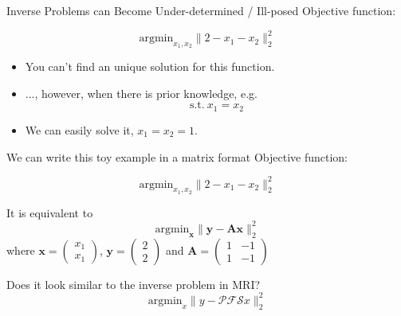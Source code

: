 \begin{frame}{Inverse Problems can Become Under-determined / Ill-posed}
	Objective function:
	
	\begin{equation}
		\mathrm{argmin}_{x_1, x_2} \lVert 2 - x_1 - x_2 \rVert_2^2
	\end{equation}

	\vfill
	
	\begin{itemize}
		\item <1-> You can't find an unique solution for this function.
		\vspace{1em}
		\item <2->..., however, when there is prior knowledge, e.g. \\
		\begin{equation}
			\mathrm{s.t.}~x_1 = x_2
		\end{equation}
	
		\item <3-> We can easily solve it, $x_1 = x_2 = 1$.
	\end{itemize}

\end{frame}


\begin{frame}{We can write this toy example in a matrix format}
	Objective function:
	
	\begin{equation}
		\mathrm{argmin}_{x_1, x_2} \lVert 2 - x_1 - x_2 \rVert_2^2
	\end{equation}

	\vspace{1em}
	
	It is equivalent to
	\begin{equation}
		\mathrm{argmin}_{\mathbf{x}} \lVert \mathbf{y} - \mathbf{A} \mathbf{x} \rVert_2^2
	\end{equation}
	\hspace{1em} where $\mathbf{x} = \begin{pmatrix}
		x_1 \\ x_1
	\end{pmatrix}$, $\mathbf{y} = \begin{pmatrix}
	2 \\ 2
	\end{pmatrix}$ and 
	$\mathbf{A} = \begin{pmatrix}
		1 & -1 \\
		1 & -1
	\end{pmatrix}$

	\vspace{3em}
	Does it look similar to the inverse problem in MRI?
	\begin{equation}
		\mathrm{argmin}_x \lVert y -  \mathcal{P} \mathcal{F} \mathcal{S} x \rVert_2^2
	\end{equation}
\end{frame}


